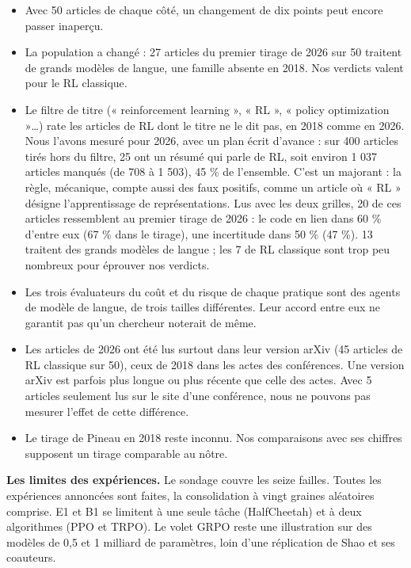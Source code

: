 \documentclass[11pt,a4paper]{article}
\begin{document}
\begin{itemize}
  ajouté aucune règle d'harmonisation, afin de lire les deux années avec
  la même grille. Les cas limites relevés, comme un calcul réduit au
  temps d'inférence ou des graines ratées écartées, restent codés comme
  le lecteur les a lus.
\item
  Avec 50 articles de chaque côté, un changement de dix points peut
  encore passer inaperçu.
\item
  La population a changé : 27 articles du premier tirage de 2026 sur 50
  traitent de grands modèles de langue, une famille absente en 2018. Nos
  verdicts valent pour le RL classique.
\item
  Le filtre de titre (« reinforcement learning », « RL », « policy
  optimization »\ldots) rate les articles de RL dont le titre ne le dit
  pas, en 2018 comme en 2026. Nous l'avons mesuré pour 2026, avec un
  plan écrit d'avance : sur 400 articles tirés hors du filtre, 25 ont un
  résumé qui parle de RL, soit environ 1 037 articles manqués (de 708 à
  1 503), 45 \% de l'ensemble. C'est un majorant : la règle, mécanique,
  compte aussi des faux positifs, comme un article où « RL » désigne
  l'apprentissage de représentations. Lus avec les deux grilles, 20 de
  ces articles ressemblent au premier tirage de 2026 : le code en lien
  dans 60 \% d'entre eux (67 \% dans le tirage), une incertitude dans 50
  \% (47 \%). 13 traitent des grands modèles de langue ; les 7 de RL
  classique sont trop peu nombreux pour éprouver nos verdicts.
\item
  Les trois évaluateurs du coût et du risque de chaque pratique sont des
  agents de modèle de langue, de trois tailles différentes. Leur accord
  entre eux ne garantit pas qu'un chercheur noterait de même.
\item
  Les articles de 2026 ont été lus surtout dans leur version arXiv (45
  articles de RL classique sur 50), ceux de 2018 dans les actes des
  conférences. Une version arXiv est parfois plus longue ou plus récente
  que celle des actes. Avec 5 articles seulement lus sur le site d'une
  conférence, nous ne pouvons pas mesurer l'effet de cette différence.
\item
  Le tirage de Pineau en 2018 reste inconnu. Nos comparaisons avec ses
  chiffres supposent un tirage comparable au nôtre.
\end{itemize}

\textbf{Les limites des expériences.} Le sondage couvre les seize
failles. Toutes les expériences annoncées sont faites, la consolidation
à vingt graines aléatoires comprise. E1 et B1 se limitent à une seule
tâche (HalfCheetah) et à deux algorithmes (PPO et TRPO). Le volet GRPO
reste une illustration sur des modèles de 0,5 et 1 milliard de
paramètres, loin d'une réplication de Shao et ses coauteurs.
\end{document}
